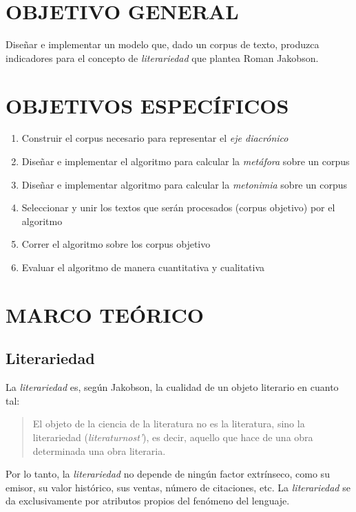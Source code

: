 \documentclass[12pt,letterpaper,twoside]{article}
\begin{document}
\section{OBJETIVO GENERAL}
\label{sec:orgc253f48}
Diseñar e implementar un modelo que, dado un corpus de texto, produzca
indicadores para el concepto de \emph{literariedad} que plantea Roman Jakobson.

\section{OBJETIVOS ESPECÍFICOS}
\label{sec:orgb4d7598}

\begin{enumerate}
\item Construir el corpus necesario para representar el \emph{eje diacrónico}
\item Diseñar e implementar el algoritmo para calcular la \emph{metáfora} sobre un corpus
\item Diseñar e implementar algoritmo para calcular la \emph{metonimia} sobre un corpus
\item Seleccionar y unir los textos que serán procesados (corpus objetivo) por el algoritmo
\item Correr el algoritmo sobre los corpus objetivo
\item Evaluar el algoritmo de manera cuantitativa y cualitativa
\end{enumerate}

\section{MARCO TEÓRICO}
\label{sec:orgb5748bf}

\subsection{Literariedad}
\label{sec:org80da492}


La \emph{literariedad} es, según Jakobson, la cualidad de un objeto
literario en cuanto tal:

\begin{quote}

El objeto de la ciencia de la literatura no es la
literatura, sino la literariedad (\emph{literaturnost'}), es decir,
aquello que hace de una obra determinada una obra
literaria. \cite[pg. 37]{eijembaum2010teoria}
\end{quote}

Por lo tanto, la \emph{literariedad} no depende de ningún factor extrínseco,
como su emisor, su valor histórico, sus ventas,
número de citaciones, etc. La \emph{literariedad} se da exclusivamente por
atributos propios del fenómeno del lenguaje.
\end{document}
